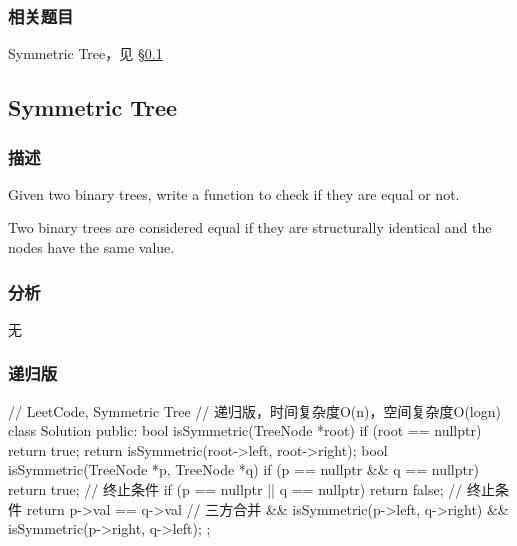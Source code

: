 \subsubsection{相关题目}
\begindot
\item Symmetric Tree，见 \S \ref{sec:symmetric-tree}
\myenddot


\subsection{Symmetric Tree}
\label{sec:symmetric-tree}


\subsubsection{描述}
Given two binary trees, write a function to check if they are equal or not.

Two binary trees are considered equal if they are structurally identical and the nodes have the same value.


\subsubsection{分析}
无


\subsubsection{递归版}
\begin{Code}
// LeetCode, Symmetric Tree
// 递归版，时间复杂度O(n)，空间复杂度O(logn)
class Solution {
public:
    bool isSymmetric(TreeNode *root) {
        if (root == nullptr) return true;
        return isSymmetric(root->left, root->right);
    }
    bool isSymmetric(TreeNode *p, TreeNode *q) {
        if (p == nullptr && q == nullptr) return true;   // 终止条件
        if (p == nullptr || q == nullptr) return false;  // 终止条件
        return p->val == q->val      // 三方合并
                && isSymmetric(p->left, q->right)
                && isSymmetric(p->right, q->left);
    }
};
\end{Code}


